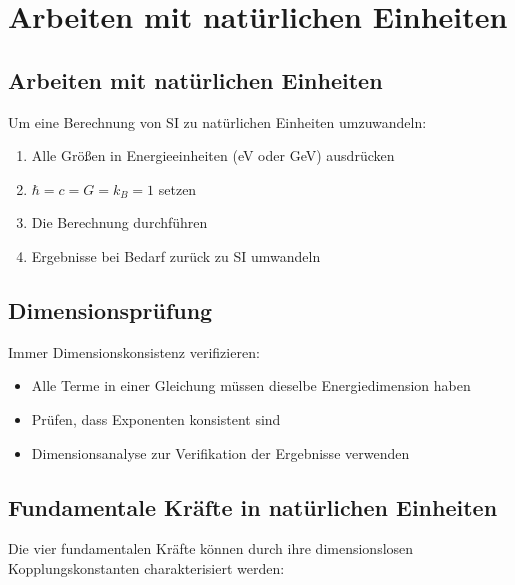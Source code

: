 \documentclass[11pt,a4paper]{article}
\begin{document}
	\section{Arbeiten mit natürlichen Einheiten}
	
	\subsection{Arbeiten mit natürlichen Einheiten}
	
	Um eine Berechnung von SI zu natürlichen Einheiten umzuwandeln:
	\begin{enumerate}
		\item Alle Größen in Energieeinheiten (eV oder GeV) ausdrücken
		\item $\hbar = c = G = k_B = 1$ setzen
		\item Die Berechnung durchführen
		\item Ergebnisse bei Bedarf zurück zu SI umwandeln
	\end{enumerate}
	
	\subsection{Dimensionsprüfung}
	
	Immer Dimensionskonsistenz verifizieren:
	\begin{itemize}
		\item Alle Terme in einer Gleichung müssen dieselbe Energiedimension haben
		\item Prüfen, dass Exponenten konsistent sind
		\item Dimensionsanalyse zur Verifikation der Ergebnisse verwenden
	\end{itemize}
	
	\subsection{Fundamentale Kräfte in natürlichen Einheiten}
	
	Die vier fundamentalen Kräfte können durch ihre dimensionslosen Kopplungskonstanten charakterisiert werden:
	
\end{document}
